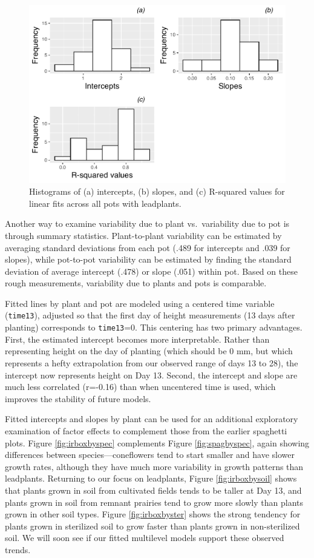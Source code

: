 \documentclass[
]{krantz}
\begin{document}
\begin{figure}

{\centering \includegraphics[width=0.6\linewidth]{bookdown-BeyondMLR_files/figure-latex/intratepot-1} 

}

\caption{Histograms of (a) intercepts, (b) slopes, and (c) R-squared values for linear fits across all pots with leadplants.}\label{fig:intratepot}
\end{figure}

Another way to examine variability due to plant vs.~variability due to pot is through summary statistics. Plant-to-plant variability can be estimated by averaging standard deviations from each pot (.489 for intercepts and .039 for slopes), while pot-to-pot variability can be estimated by finding the standard deviation of average intercept (.478) or slope (.051) within pot. Based on these rough measurements, variability due to plants and pots is comparable.

Fitted lines by plant and pot are modeled using a centered time variable (\texttt{time13}), adjusted so that the first day of height measurements (13 days after planting) corresponds to \texttt{time13}=0. This centering has two primary advantages. First, the estimated intercept becomes more interpretable. Rather than representing height on the day of planting (which should be 0 mm, but which represents a hefty extrapolation from our observed range of days 13 to 28), the intercept now represents height on Day 13. Second, the intercept and slope are much less correlated (r=-0.16) than when uncentered time is used, which improves the stability of future models.

Fitted intercepts and slopes by plant can be used for an additional exploratory examination of factor effects to complement those from the earlier spaghetti plots. Figure \ref{fig:irboxbyspec} complements Figure \ref{fig:spagbyspec}, again showing differences between species---coneflowers tend to start smaller and have slower growth rates, although they have much more variability in growth patterns than leadplants. Returning to our focus on leadplants, Figure \ref{fig:irboxbysoil} shows that plants grown in soil from cultivated fields tends to be taller at Day 13, and plants grown in soil from remnant prairies tend to grow more slowly than plants grown in other soil types. Figure \ref{fig:irboxbyster} shows the strong tendency for plants grown in sterilized soil to grow faster than plants grown in non-sterilized soil. We will soon see if our fitted multilevel models support these observed trends.
\end{document}
